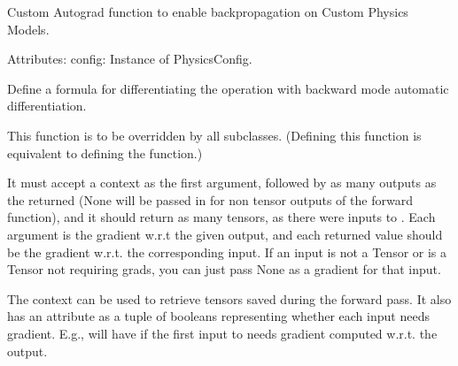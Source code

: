 \documentclass[letterpaper,10pt,english]{sphinxmanual}
\begin{document}

\begin{fulllineitems}
\label{\detokenize{api:hypyml.models.Physics}}
\pysigstartsignatures
{}
\pysigstopsignatures
\sphinxAtStartPar
Custom Autograd function to enable backpropagation on Custom Physics Models.

\sphinxAtStartPar
Attributes:
config: Instance of PhysicsConfig.

\begin{fulllineitems}
\label{\detokenize{api:hypyml.models.Physics.backward}}
\pysigstartsignatures
{}
\pysigstopsignatures
\sphinxAtStartPar
Define a formula for differentiating the operation with backward mode automatic differentiation.

\sphinxAtStartPar
This function is to be overridden by all subclasses.
(Defining this function is equivalent to defining the  function.)

\sphinxAtStartPar
It must accept a context  as the first argument, followed by
as many outputs as the {\hyperref[\detokenize{api:hypyml.models.Physics.forward}]{}} returned (None will be passed in
for non tensor outputs of the forward function),
and it should return as many tensors, as there were inputs to
{\hyperref[\detokenize{api:hypyml.models.Physics.forward}]{}}. Each argument is the gradient w.r.t the given output,
and each returned value should be the gradient w.r.t. the
corresponding input. If an input is not a Tensor or is a Tensor not
requiring grads, you can just pass None as a gradient for that input.

\sphinxAtStartPar
The context can be used to retrieve tensors saved during the forward
pass. It also has an attribute  as a tuple
of booleans representing whether each input needs gradient. E.g.,
{\hyperref[\detokenize{api:hypyml.models.Physics.backward}]{}} will have  if the
first input to {\hyperref[\detokenize{api:hypyml.models.Physics.forward}]{}} needs gradient computed w.r.t. the
output.


\end{fulllineitems}
\end{fulllineitems}
\end{document}
